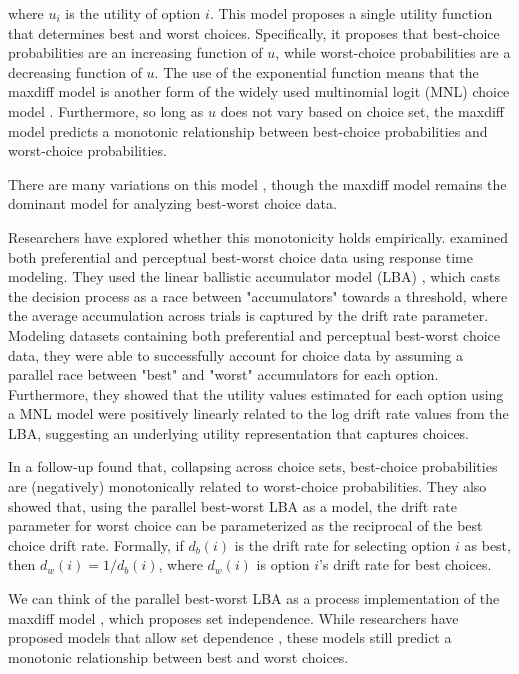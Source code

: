 where $u_{i}$ is the utility of option $i$. This model proposes a single utility function that determines best and worst choices. Specifically, it proposes that best-choice probabilities are an increasing function of $u$, while worst-choice probabilities are a decreasing function of $u$. The use of the exponential function means that the maxdiff model is another form of the widely used multinomial logit (MNL) choice model \parencite{hausman1984specification}. Furthermore, so long as $u$ does not vary based on choice set, the maxdiff model predicts a monotonic relationship between best-choice probabilities and worst-choice probabilities.

There are many variations on this model \parencite{marleyProbabilisticModelsBest2005a,marleyProbabilisticModelsSetdependent2008,marleyModelsBestWorst2012,flynnBestWorstScaling2007,flynn2014best}, though the maxdiff model remains the dominant model for analyzing best-worst choice data.

Researchers have explored whether this monotonicity holds empirically. \textcite{hawkinsIntegratingCognitiveProcess2014a} examined both preferential and perceptual best-worst choice data using response time modeling. They used the linear ballistic accumulator model (LBA) \textcite{brownSimplestCompleteModel2008b}, which casts the decision process as a race between "accumulators" towards a threshold, where the average accumulation across trials is captured by the drift rate parameter. Modeling datasets containing both preferential and perceptual best-worst choice data, they were able to successfully account for choice data by assuming a parallel race between "best" and "worst" accumulators for each option. Furthermore, they showed that the utility values estimated for each option using a MNL model were positively linearly related to the log drift rate values from the LBA, suggesting an underlying utility representation that captures choices. 

In a follow-up \textcite{hawkinsBestTimesWorst2014} found that, collapsing across choice sets, best-choice probabilities are (negatively) monotonically related to worst-choice probabilities. They also showed that, using the parallel best-worst LBA as a model, the drift rate parameter for worst choice can be parameterized as the reciprocal of the best choice drift rate. Formally, if $d_{b}(i)$ is the drift rate for selecting option $i$ as best, then $d_{w}(i)=1/d_{b}(i)$, where $d_{w}(i)$ is option $i$'s drift rate for best choices. 

We can think of the parallel best-worst LBA as a process implementation of the maxdiff model \parencite{hawkinsIntegratingCognitiveProcess2014a}, which proposes set independence. While researchers have proposed models that allow set dependence \parencite{marleyProbabilisticModelsSetdependent2008}, these models still predict a monotonic relationship between best and worst choices. 

